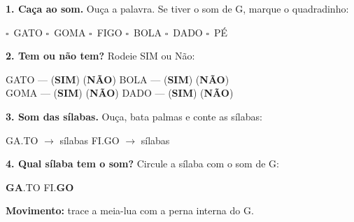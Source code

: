 \begin{somletra}
\textbf{1. Ca\c{c}a ao som.} Ou\c{c}a a palavra. Se tiver o som de G, marque o quadradinho:
\begin{center}
$\square$~GATO \quad $\square$~GOMA \quad $\square$~FIGO \quad $\square$~BOLA \quad $\square$~DADO \quad $\square$~P\'E
\end{center}

\textbf{2. Tem ou n\~ao{} tem?} Rodeie SIM ou N\~ao:
\begin{center}
GATO --- (\textbf{SIM}) (\textbf{N\~AO}) \quad BOLA --- (\textbf{SIM}) (\textbf{N\~AO}) \\ GOMA --- (\textbf{SIM}) (\textbf{N\~AO}) \quad DADO --- (\textbf{SIM}) (\textbf{N\~AO})
\end{center}
\end{somletra}

\begin{somsilaba}
\textbf{3. Som das s\'ilabas.} Ou\c{c}a, bata palmas e conte as s\'ilabas:
\begin{center}
GA.TO $\rightarrow$ \underline{\hspace{1cm}} s\'ilabas \quad FI.GO $\rightarrow$ \underline{\hspace{1cm}} s\'ilabas
\end{center}

\textbf{4. Qual s\'ilaba tem o som?} Circule a s\'ilaba com o som de G:
\begin{center}
\textbf{GA}.TO \quad FI.\textbf{GO}
\end{center}
\end{somsilaba}



\begin{motricidade}
\textbf{Movimento:} trace a meia-lua com a perna interna do G.
\begin{center}
\end{center}
\end{motricidade}

